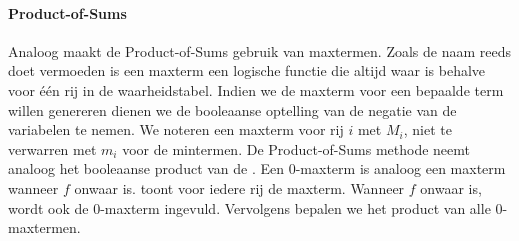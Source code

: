 \paragraph{Product-of-Sums}
Analoog maakt de Product-of-Sums gebruik van maxtermen. Zoals de naam reeds doet vermoeden is een maxterm een logische functie die altijd waar is behalve voor \'e\'en rij in de waarheidstabel. Indien we de maxterm voor een bepaalde term willen genereren dienen we de booleaanse optelling van de negatie van de variabelen te nemen. We noteren een maxterm voor rij $i$ met $M_i$, niet te verwarren met $m_i$ voor de mintermen. De Product-of-Sums methode neemt analoog het booleaanse product van de . Een 0-maxterm is analoog een maxterm wanneer $f$ onwaar is.  toont voor iedere rij de maxterm. Wanneer $f$ onwaar is, wordt ook de 0-maxterm ingevuld. Vervolgens bepalen we het product van alle 0-maxtermen.

